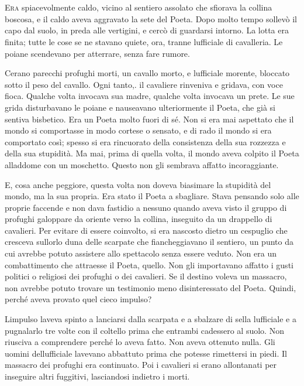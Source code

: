 	\chapter{\phantom{title}}

\lettrine{E}{ra} spiacevolmente caldo, vicino al sentiero assolato che sfiorava la
collina boscosa, e il caldo aveva aggravato la sete del Poeta. Dopo
molto tempo sollevò il capo dal suolo, in preda alle vertigini, e cercò
di guardarsi intorno. La lotta era finita; tutte le cose se ne stavano
quiete, ora, tranne l\textquotesingle ufficiale di cavalleria. Le poiane
scendevano per atterrare, senza fare rumore.

C\textquotesingle erano parecchi profughi morti, un cavallo morto, e
l\textquotesingle ufficiale morente, bloccato sotto il peso del cavallo.
Ogni tanto,. il cavaliere rinveniva e gridava, con voce fioca. Qualche
volta invocava sua madre, qualche volta invocava un prete. Le sue grida
disturbavano le poiane e nauseavano ulteriormente il Poeta, che già si
sentiva bisbetico. Era un Poeta molto fuori di sé. Non si era mai
aspettato che il mondo si comportasse in modo cortese o sensato, e di
rado il mondo si era comportato così; spesso si era rincuorato della
consistenza della sua rozzezza e della sua stupidità. Ma mai, prima di
quella volta, il mondo aveva colpito il Poeta all\textquotesingle addome
con un moschetto. Questo non gli sembrava affatto incoraggiante.

E, cosa anche peggiore, questa volta non doveva biasimare la stupidità
del mondo, ma la sua propria. Era stato il Poeta a sbagliare. Stava
pensando solo alle proprie faccende e non dava fastidio a nessuno quando
aveva visto il gruppo di profughi galoppare da oriente verso la collina,
inseguito da un drappello di cavalieri. Per evitare di essere coinvolto,
si era nascosto dietro un cespuglio che cresceva
sull\textquotesingle orlo d\textquotesingle una delle scarpate che
fiancheggiavano il sentiero, un punto da cui avrebbe potuto assistere
allo spettacolo senza essere veduto. Non era un combattimento che
attraesse il Poeta, quello. Non gli importavano affatto i gusti politici
o religiosi dei profughi o dei cavalieri. Se il destino voleva un
massacro, non avrebbe potuto trovare un testimonio meno disinteressato
del Poeta. Quindi, perché aveva provato quel cieco impulso?

L\textquotesingle impulso l\textquotesingle aveva spinto a lanciarsi
dalla scarpata e a sbalzare di sella l\textquotesingle ufficiale e a
pugnalarlo tre volte con il coltello prima che entrambi cadessero al
suolo. Non riusciva a comprendere perché lo aveva fatto. Non aveva
ottenuto nulla. Gli uomini dell\textquotesingle ufficiale
l\textquotesingle avevano abbattuto prima che potesse rimettersi in
piedi. Il massacro dei profughi era continuato. Poi i cavalieri si erano
allontanati per inseguire altri fuggitivi, lasciandosi indietro i morti.

